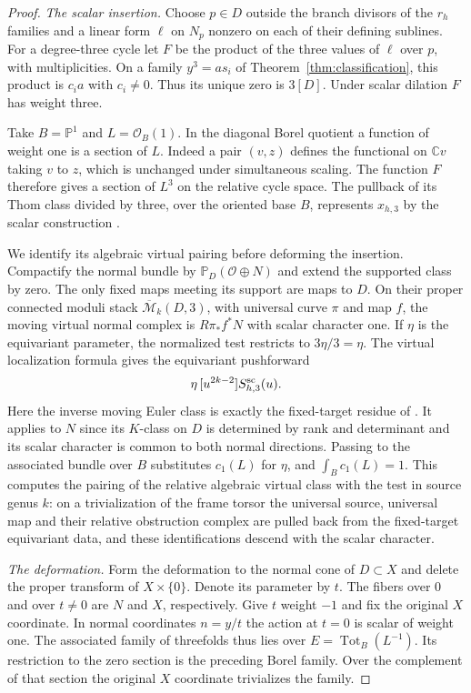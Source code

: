 \begin{proof}
\emph{The scalar insertion.}
Choose $p\in D$ outside the branch divisors of the $r_h$ families and
a linear form $\ell$ on $N_p$ nonzero on each of their defining
sublines. For a degree-three cycle let $F$ be the product of the
three values of $\ell$ over $p$, with multiplicities. On a family
$y^3=a s_i$ of Theorem~\ref{thm:classification}, this product is
$c_i a$ with $c_i\ne0$. Thus its unique zero is $3[D]$. Under
scalar dilation $F$ has weight three.

Take $B=\mathbb P^1$ and $L=\mathcal O_B(1)$. In the diagonal Borel
quotient a function of weight one is a section of $L$. Indeed a
pair $(v,z)$ defines the functional on $\mathbb Cv$ taking $v$ to
$z$, which is unchanged under simultaneous scaling. The function
$F$ therefore gives a section of $L^3$ on the relative cycle space.
The pullback of its Thom class divided by three, over the oriented
base $B$, represents $x_{h,3}$ by the scalar construction
\cite[\S4.3]{Pardon}.

We identify its algebraic virtual pairing before deforming the
insertion. Compactify the normal bundle by
$\mathbb P_D(\mathcal O\oplus N)$ and extend the supported class by
zero. The only fixed maps meeting its support are maps to $D$. On
their proper connected moduli stack
$\overline{\mathcal M}_k(D,3)$, with universal curve $\pi$ and map
$f$, the moving virtual normal complex is $R\pi_*f^*N$ with scalar
character one. If $\eta$ is the equivariant parameter, the
normalized test restricts to $3\eta/3=\eta$. The virtual localization
formula \cite{GP} gives the equivariant pushforward
\[
              \eta\,[u^{2k-2}]S^{\rm sc}_{h,3}(u).
\]
Here the inverse moving Euler class is exactly the fixed-target
residue of \cite[\S2.2]{BP}. It applies to $N$ since its
$K$-class on $D$ is determined by rank and determinant and its
scalar character is common to both normal directions. Passing to the
associated bundle over $B$ substitutes $c_1(L)$ for $\eta$, and
$\int_Bc_1(L)=1$. This computes the pairing of the relative
algebraic virtual class with the test in source genus $k$: on a
trivialization of the frame torsor the universal source, universal
map and their relative obstruction complex are pulled back from the
fixed-target equivariant data, and these identifications descend
with the scalar character.

\emph{The deformation.}
Form the deformation to the normal cone of $D\subset X$ and delete
the proper transform of $X\times\{0\}$. Denote its parameter by $t$.
The fibers over $0$ and over $t\ne0$ are $N$ and $X$, respectively.
Give $t$ weight $-1$ and fix the original $X$ coordinate. In normal
coordinates $n=y/t$ the action at $t=0$ is scalar of weight one.
The associated family of threefolds thus lies over
$E=\operatorname{Tot}_B(L^{-1})$. Its restriction to the zero
section is the preceding Borel family. Over the complement of that
section the original $X$ coordinate trivializes the family.


\end{proof}
